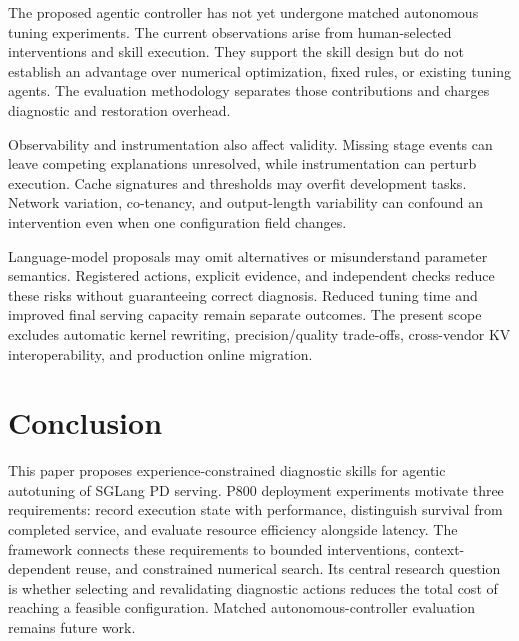 \documentclass[11pt,a4paper]{article}
\begin{document}
The proposed agentic controller has not yet undergone matched autonomous tuning experiments. The current observations arise from human-selected interventions and skill execution. They support the skill design but do not establish an advantage over numerical optimization, fixed rules, or existing tuning agents. The evaluation methodology separates those contributions and charges diagnostic and restoration overhead.

Observability and instrumentation also affect validity. Missing stage events can leave competing explanations unresolved, while instrumentation can perturb execution. Cache signatures and thresholds may overfit development tasks. Network variation, co-tenancy, and output-length variability can confound an intervention even when one configuration field changes.

Language-model proposals may omit alternatives or misunderstand parameter semantics. Registered actions, explicit evidence, and independent checks reduce these risks without guaranteeing correct diagnosis. Reduced tuning time and improved final serving capacity remain separate outcomes. The present scope excludes automatic kernel rewriting, precision/quality trade-offs, cross-vendor KV interoperability, and production online migration.

\section{Conclusion}
This paper proposes experience-constrained diagnostic skills for agentic autotuning of SGLang PD serving. P800 deployment experiments motivate three requirements: record execution state with performance, distinguish survival from completed service, and evaluate resource efficiency alongside latency. The framework connects these requirements to bounded interventions, context-dependent reuse, and constrained numerical search. Its central research question is whether selecting and revalidating diagnostic actions reduces the total cost of reaching a feasible configuration. Matched autonomous-controller evaluation remains future work.



{\small
{}
\setlength{\bibsep}{5pt plus 1pt minus 1pt}


}
\end{document}
